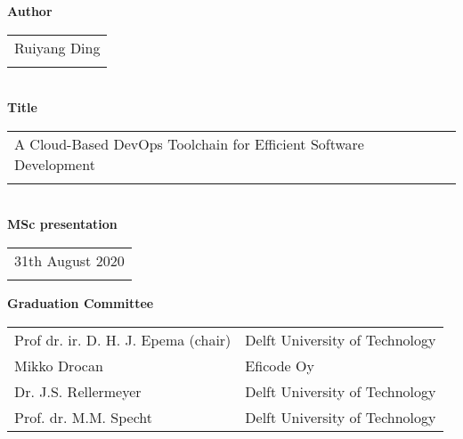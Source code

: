 \thispagestyle{empty}

\noindent \textbf{Author}\\
\begin{tabular}{l}
Ruiyang Ding\\
\\
\end{tabular}\\
\noindent \textbf{Title}\\
\begin{tabular}{l}
A Cloud-Based DevOps Toolchain for Efficient Software Development\\
\\
\end{tabular}\\
\noindent \textbf{MSc presentation}\\
\begin{tabular}{l}
31th August 2020\\
\\
\end{tabular}

\vspace{1.1cm}

\noindent \textbf{Graduation Committee}\\
\begin{tabular}{ll}
Prof dr. ir. D. H. J. Epema (chair) & Delft University of Technology \\
Mikko Drocan & Eficode Oy \\
Dr. J.S. Rellermeyer & Delft University of Technology \\
Prof. dr. M.M. Specht & Delft University of Technology \\
\end{tabular}

